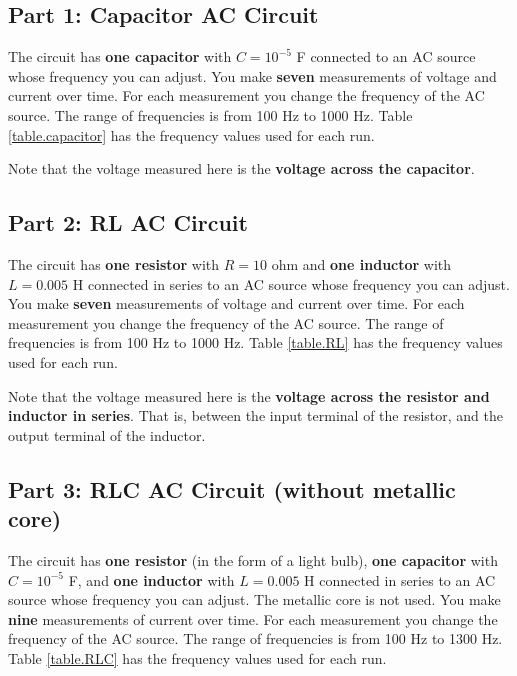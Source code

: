 \subsection{Part 1: Capacitor AC Circuit}
The circuit has \textbf{one capacitor} with $C = 10^{-5}$ F connected to an AC source whose frequency you can adjust. You make \textbf{seven} measurements of voltage and current over time. For each measurement you change the frequency of the AC source. The range of frequencies is from 100 Hz to 1000 Hz. Table \ref{table.capacitor} has the frequency values used for each run.

Note that the voltage measured here is the \textbf{voltage across the capacitor}.
\subsection{Part 2: RL AC Circuit}
The circuit has \textbf{one resistor} with $R = 10 $ ohm and \textbf{one inductor} with $L = 0.005$ H connected in series to an AC source whose frequency you can adjust. You make \textbf{seven} measurements of voltage and current over time. For each measurement you change the frequency of the AC source. The range of frequencies is from 100 Hz to 1000 Hz. Table \ref{table.RL} has the frequency values used for each run.

Note that the voltage measured here is the \textbf{voltage across the resistor and inductor in series}. That is, between the input terminal of the resistor, and the output terminal of the inductor.
\subsection{Part 3: RLC AC Circuit (without metallic core)}
The circuit has \textbf{one resistor} (in the form of a light bulb), \textbf{one capacitor} with $C = 10^{-5}$ F, and \textbf{one inductor} with $L = 0.005$ H connected in series to an AC source whose frequency you can adjust. The metallic core is not used. You make \textbf{nine} measurements of current over time. For each measurement you change the frequency of the AC source. The range of frequencies is from 100 Hz to 1300 Hz. Table \ref{table.RLC} has the frequency values used for each run.

